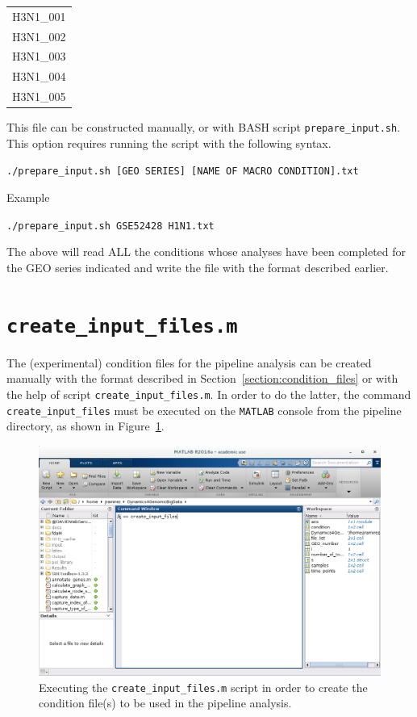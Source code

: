 \documentclass[final,letterpaper,twoside,12pt]{article}
\begin{document}
\begin{center}
\begin{tabular}{ c }

H3N1\_001 \\
H3N1\_002 \\
H3N1\_003 \\
H3N1\_004 \\
H3N1\_005 \\

\end{tabular}
\end{center}


\par This file can be constructed manually, or with BASH script \texttt{prepare\_input.sh}. This option requires running the script with the following syntax.

\texttt{./prepare\_input.sh [GEO SERIES] [NAME OF MACRO CONDITION].txt}

\par Example

\texttt{./prepare\_input.sh GSE52428 H1N1.txt}

\par The above will read ALL the conditions whose analyses have been completed for the GEO series indicated and write the file with the format described earlier.

\section{\texttt{create\_input\_files.m}}
\label{section:user_functions}

\par The (experimental) condition files for the pipeline analysis can be created manually with the format described in Section~\ref{section:condition_files} or with the help of script \texttt{create\_input\_files.m}. In order to do the latter, the command \texttt{create\_input\_files} must be executed on the \texttt{MATLAB} console from the pipeline directory, as shown in Figure~\ref{figure:create_files}.

\iffalse
\begin{figure}[h]
\includegraphics[width=\textwidth]{create_files}
\caption{Executing the \texttt{create\_input\_files.m} script in order to create the condition file(s) to be used in the pipeline analysis.}
\label{figure:create_files}
\end{figure}
\end{document}

